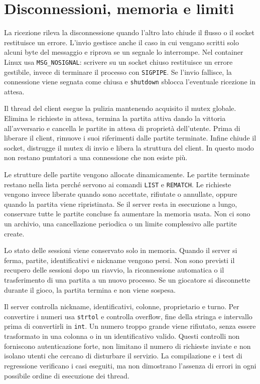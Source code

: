 \documentclass[11pt,a4paper]{article}
\begin{document}
\clearpage

\section{Disconnessioni, memoria e limiti}

La ricezione rileva la disconnessione quando l'altro lato chiude il flusso o il socket restituisce un errore. L'invio gestisce anche il caso in cui vengano scritti solo alcuni byte del messaggio e riprova se un segnale lo interrompe. Nel container Linux usa \texttt{MSG\_NOSIGNAL}: scrivere su un socket chiuso restituisce un errore gestibile, invece di terminare il processo con \texttt{SIGPIPE}. Se l'invio fallisce, la connessione viene segnata come chiusa e \texttt{shutdown} sblocca l'eventuale ricezione in attesa.

Il thread del client esegue la pulizia mantenendo acquisito il mutex globale. Elimina le richieste in attesa, termina la partita attiva dando la vittoria all'avversario e cancella le partite in attesa di proprietà dell'utente. Prima di liberare il client, rimuove i suoi riferimenti dalle partite terminate. Infine chiude il socket, distrugge il mutex di invio e libera la struttura del client. In questo modo non restano puntatori a una connessione che non esiste più.

Le strutture delle partite vengono allocate dinamicamente. Le partite terminate restano nella lista perché servono ai comandi \texttt{LIST} e \texttt{REMATCH}. Le richieste vengono invece liberate quando sono accettate, rifiutate o annullate, oppure quando la partita viene ripristinata. Se il server resta in esecuzione a lungo, conservare tutte le partite concluse fa aumentare la memoria usata. Non ci sono un archivio, una cancellazione periodica o un limite complessivo alle partite create.

Lo stato delle sessioni viene conservato solo in memoria. Quando il server si ferma, partite, identificativi e nickname vengono persi. Non sono previsti il recupero delle sessioni dopo un riavvio, la riconnessione automatica o il trasferimento di una partita a un nuovo processo. Se un giocatore si disconnette durante il gioco, la partita termina e non viene sospesa.

Il server controlla nickname, identificativi, colonne, proprietario e turno. Per convertire i numeri usa \texttt{strtol} e controlla overflow, fine della stringa e intervallo prima di convertirli in \texttt{int}. Un numero troppo grande viene rifiutato, senza essere trasformato in una colonna o in un identificativo valido. Questi controlli non forniscono autenticazione forte, non limitano il numero di richieste inviate e non isolano utenti che cercano di disturbare il servizio. La compilazione e i test di regressione verificano i casi eseguiti, ma non dimostrano l'assenza di errori in ogni possibile ordine di esecuzione dei thread.
\end{document}
